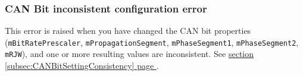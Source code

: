 \documentclass[9pt, a4paper, obeyspaces, openany]{extarticle}
\newcommand\refSubsectionPage[1]{\hyperref[subsec:#1]{section \ref*{subsec:#1} page \pageref{subsec:#1}}}
\newcommand \subsubsectionLabel[2]{\subsubsection{#1}\label{subsubsec:#2}}
\begin{document}
\subsubsectionLabel{CAN Bit inconsistent configuration error}{CANBitInconsistentConfigError}

This error is raised when you have changed the CAN bit properties (\texttt{mBitRatePrescaler}, \texttt{mPropagationSegment}, \texttt{mPhaseSegment1}, \texttt{mPhaseSegment2}, \texttt{mRJW}), and one or more resulting values are inconsistent. See \refSubsectionPage{CANBitSettingConsistency}.

%
%
%
%
%
\end{document}
